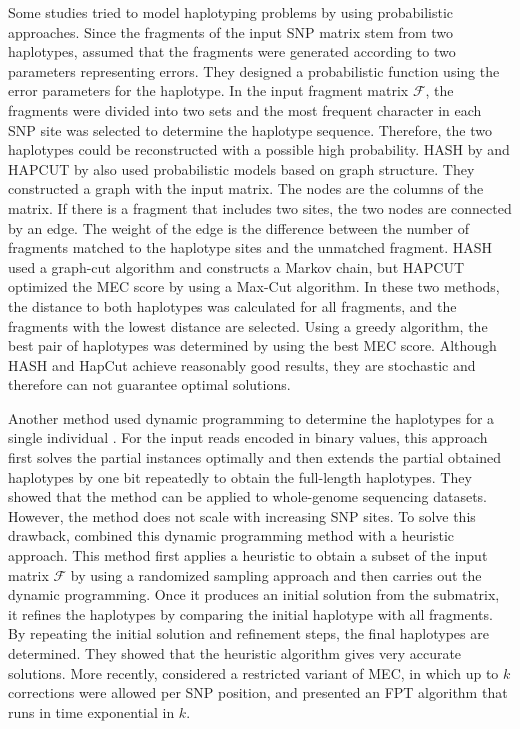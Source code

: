Some studies tried to model haplotyping problems by using probabilistic approaches. 
Since the fragments of the input SNP matrix stem from two haplotypes, 
\cite{chen2008linear} assumed that the fragments were generated according to two parameters representing errors. 
They designed a probabilistic function using the error parameters for the haplotype. 
In the input fragment matrix $\mathcal{F}$, the fragments were divided into two sets and the most frequent character 
in each SNP site was selected to determine the haplotype sequence. 
Therefore, the two haplotypes could be reconstructed with a possible high probability. 
HASH by \cite{bansal2008mcmc} and HAPCUT by \cite{Bansal2008} also used probabilistic models based on graph structure. 
They constructed a graph with the input matrix. The nodes are the columns of the matrix. 
If there is a fragment that includes two sites, the two nodes are connected by an edge. 
The weight of the edge is the difference between the number of fragments matched to the haplotype sites and the unmatched fragment. 
HASH used a graph-cut algorithm and constructs a Markov chain, 
but HAPCUT optimized the MEC score by using a Max-Cut algorithm. 
In these two methods, the distance to both haplotypes was calculated for all fragments, and the fragments with the lowest distance are selected. 
Using a greedy algorithm, the best pair of haplotypes was determined by using the best MEC score.
Although HASH and HapCut achieve reasonably good results, they are stochastic and therefore can not guarantee optimal solutions.

Another method used dynamic programming to determine the haplotypes for a single individual \citep{he2010optimal}. 
For the input reads encoded in binary values, this approach first solves the partial instances optimally and then extends the partial obtained haplotypes by one bit repeatedly to obtain the full-length haplotypes. 
They showed that the method can be applied to whole-genome sequencing datasets. However, the method does not scale with increasing SNP sites.
To solve this drawback, \cite{deng2013highly} combined this dynamic programming method with a heuristic approach. 
This method first applies a heuristic to obtain a subset of the input matrix $\mathcal{F}$ by using a randomized sampling approach and then carries out the dynamic programming. 
Once it produces an initial solution from the submatrix, it refines the haplotypes by comparing the initial haplotype with all fragments. 
By repeating the initial solution and refinement steps, the final haplotypes are determined.
They showed that the heuristic algorithm gives very accurate solutions.
More recently, \cite{Pirola2015} considered a restricted variant of MEC, in which up to $k$ corrections were allowed per SNP position, 
and presented an FPT algorithm that runs in time exponential in $k$.

